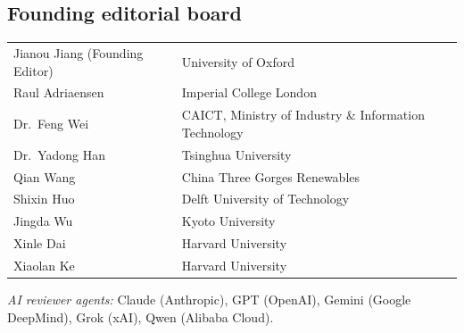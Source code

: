\documentclass[11pt]{article}
\begin{document}
\subsection*{Founding editorial board}
\begin{center}\small
\renewcommand{\arraystretch}{1.15}
\begin{tabular}{@{}ll@{}}
Jianou Jiang (Founding Editor) & University of Oxford \\
Raul Adriaensen & Imperial College London \\
Dr.\ Feng Wei & CAICT, Ministry of Industry \& Information Technology \\
Dr.\ Yadong Han & Tsinghua University \\
Qian Wang & China Three Gorges Renewables \\
Shixin Huo & Delft University of Technology \\
Jingda Wu & Kyoto University \\
Xinle Dai & Harvard University \\
Xiaolan Ke & Harvard University \\
\end{tabular}
\end{center}
\emph{AI reviewer agents:} Claude (Anthropic), GPT (OpenAI), Gemini (Google DeepMind), Grok (xAI), Qwen (Alibaba Cloud).

\end{document}
